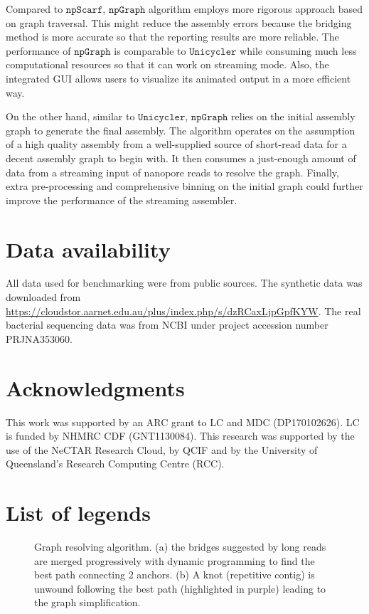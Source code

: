 \documentclass[10pt,letterpaper]{article}
\newcommand{\npscarf}{$\mathtt{npScarf}$}
\newcommand{\npgraph}{$\mathtt{npGraph}$}
\newcommand{\unicycler}{$\mathtt{Unicycler}$}
\begin{document}
Compared to \npscarf, \npgraph{} algorithm employs more rigorous approach based on graph traversal. This might reduce the assembly errors because the bridging method is more accurate so that the reporting results are more reliable.
The performance of \npgraph{} is comparable to \unicycler{} while consuming much less computational resources so that it can work on streaming mode. 
Also, the integrated GUI allows users to visualize its animated output in a  more efficient way.

On the other hand, similar to \unicycler{}, \npgraph{} relies on the initial assembly graph to generate the final assembly. The algorithm operates on the assumption of a high quality assembly from a well-supplied source of short-read data for a decent assembly graph to begin with.
It then consumes a just-enough amount of data from a streaming input of nanopore reads to resolve the graph. 
Finally, extra pre-processing and comprehensive binning on the initial graph could further improve the performance of the streaming assembler.

\section*{Data availability}
All data used for benchmarking were from public sources. The synthetic data was downloaded from \url{https://cloudstor.aarnet.edu.au/plus/index.php/s/dzRCaxLjpGpfKYW}. The real bacterial sequencing data was from NCBI under project accession number PRJNA353060.

\section*{Acknowledgments}
This work was supported by an ARC grant to LC and MDC (DP170102626).  LC is funded by NHMRC CDF (GNT1130084).  This research was supported by the use of the NeCTAR Research Cloud, by QCIF and by the University of Queensland’s Research Computing Centre (RCC).

\nolinenumbers
\pagebreak
\section*{List of legends}

\begin{figure}[!hpt]
\centering
\caption{Graph resolving algorithm. (a) the bridges suggested by long reads are merged progressively with dynamic programming to find the best path connecting 2 anchors. (b) A knot (repetitive contig) is unwound following the best path (highlighted in purple) leading to the graph simplification.}
\label{figure:npgraph_pipeline}
\end{figure}
\end{document}
